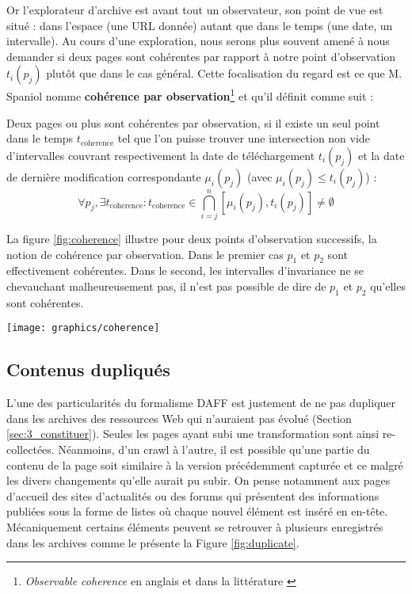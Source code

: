 \documentclass[symmetric,justified,marginals=raggedouter]{tufte-book}
\begin{document}
Or l'explorateur d'archive est avant tout un observateur, son point de vue est situé : dans l'espace (une URL donnée) autant que dans le temps (une date, un intervalle). Au cours d'une exploration, nous serons plus souvent amené à nous demander si deux pages sont cohérentes par rapport à notre point d'observation $t_i(p_j)$ plutôt que dans le cas général. Cette focalisation du regard est ce que M. Spaniol nomme \textbf{cohérence par observation}\footnote{\textit{Observable coherence} en anglais et dans la littérature \citep{spaniol_data_2009}} et qu'il définit comme suit :\\

\begin{itshape}
\noindent Deux pages ou plus sont cohérentes par observation, si il existe un seul point dans le temps $t_{\mathrm{coherence}}$ tel que l'on puisse trouver une intersection non vide d'intervalles couvrant respectivement la date de téléchargement $t_i(p_j)$ et la date de dernière modification correspondante $\mu_i(p_j)$ (avec $\mu_i(p_j) \leq t_i(p_j)$) :
\[
	\forall p_j, \exists t_{\mathrm{coherence}}:t_{\mathrm{coherence}} \in \bigcap^n_{i=j}[\mu_i(p_j),t_i(p_j)] \neq \emptyset
\]
\end{itshape}

\noindent La figure \ref{fig:coherence} illustre pour deux points d'observation successifs, la notion de cohérence par observation. Dans le premier cas $p_1$ et $p_2$ sont effectivement cohérentes. Dans le second, les intervalles d'invariance ne se chevauchant malheureusement pas, il n'est pas possible de dire de $p_1$ et $p_2$ qu'elles sont cohérentes. 

\begin{figure*}%
  \texttt{[image: graphics/coherence]}
  \caption{Cohérence par observation entre les pages $p_1$ et $p_2$}
  \label{fig:coherence}
\end{figure*}

\subsection{Contenus dupliqués}

\noindent L'une des particularités du formalisme DAFF est justement de ne pas dupliquer dans les archives des ressources Web qui n'auraient pas évolué (Section \ref{sec:3_constituer}). Seules les pages ayant subi une transformation sont ainsi re-collectées. Néanmoins, d'un crawl à l'autre, il est possible qu'une partie du contenu de la page soit similaire à la version précédemment capturée et ce malgré les divers changements qu'elle aurait pu subir. On pense notamment aux pages d'accueil des sites d'actualités ou des forums qui présentent des informations publiées sous la forme de listes où chaque nouvel élément est inséré en en-tête. Mécaniquement certains éléments peuvent se retrouver à plusieurs enregistrés dans les archives comme le présente la Figure \ref{fig:duplicate}.
\end{document}
